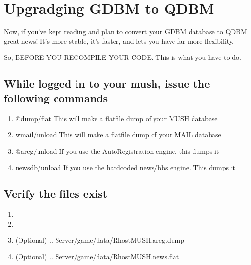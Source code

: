 \documentclass[letterpaper,10pt,english]{sphinxmanual}
\begin{document}
\section{Upgradging GDBM to QDBM}
\label{\detokenize{33-qdbm:upgradging-gdbm-to-qdbm}}
\sphinxAtStartPar
Now, if you’ve kept reading and plan to convert your GDBM database to QDBM great news!
It’s more stable, it’s faster, and lets you have far more flexibility.

\sphinxAtStartPar
So, BEFORE YOU RECOMPILE YOUR CODE.  This is what you have to do.


\subsection{While logged in to your mush, issue the following commands}
\label{\detokenize{33-qdbm:while-logged-in-to-your-mush-issue-the-following-commands}}\begin{enumerate}
%
\item {} 
\sphinxAtStartPar
@dump/flat    \textendash{} This will make a flatfile dump of your MUSH database

\item {} 
\sphinxAtStartPar
wmail/unload  \textendash{} This will make a flatfile dump of your MAIL database

\item {} 
\sphinxAtStartPar
@areg/unload  \textendash{} If you use the AutoRegistration engine, this dumps it

\item {} 
\sphinxAtStartPar
newsdb/unload \textendash{} If you use the hardcoded news/bbs engine.  This dumps it

\end{enumerate}


\subsection{Verify the files exist}
\label{\detokenize{33-qdbm:verify-the-files-exist}}\begin{enumerate}
%
\item {} 
\item {} 
\item {} 
\sphinxAtStartPar
(Optional) .. Server/game/data/RhostMUSH.areg.dump

\item {} 
\sphinxAtStartPar
(Optional) .. Server/game/data/RhostMUSH.news.flat

\end{enumerate}
\end{document}
